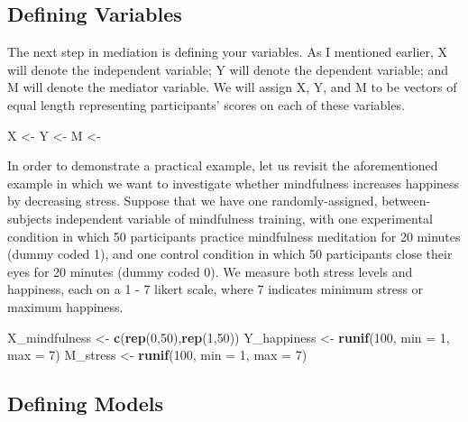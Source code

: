 \documentclass[]{book}
\newenvironment{Shaded}{\begin{snugshade}}{\end{snugshade}}
\newcommand{\DataTypeTok}[1]{\textcolor[rgb]{0.13,0.29,0.53}{#1}}
\newcommand{\DecValTok}[1]{\textcolor[rgb]{0.00,0.00,0.81}{#1}}
\newcommand{\KeywordTok}[1]{\textcolor[rgb]{0.13,0.29,0.53}{\textbf{#1}}}
\newcommand{\NormalTok}[1]{#1}
\newcommand{\StringTok}[1]{\textcolor[rgb]{0.31,0.60,0.02}{#1}}
\begin{document}
\hypertarget{defining-variables}{%
\subsection{Defining Variables}\label{defining-variables}}

The next step in mediation is defining your variables. As I mentioned earlier, X will denote the independent variable; Y will denote the dependent variable; and M will denote the mediator variable. We will assign X, Y, and M to be vectors of equal length representing participants' scores on each of these variables.

\begin{Shaded}
\begin{Highlighting}[]
\NormalTok{X <-}
\NormalTok{Y <-}
\NormalTok{M <-}
\end{Highlighting}
\end{Shaded}

In order to demonstrate a practical example, let us revisit the aforementioned example in which we want to investigate whether mindfulness increases happiness by decreasing stress. Suppose that we have one randomly-assigned, between-subjects independent variable of mindfulness training, with one experimental condition in which 50 participants practice mindfulness meditation for 20 minutes (dummy coded 1), and one control condition in which 50 participants close their eyes for 20 minutes (dummy coded 0). We measure both stress levels and happiness, each on a 1 - 7 likert scale, where 7 indicates minimum stress or maximum happiness.

\begin{Shaded}
\begin{Highlighting}[]
\NormalTok{X_mindfulness <-}\StringTok{ }\KeywordTok{c}\NormalTok{(}\KeywordTok{rep}\NormalTok{(}\DecValTok{0}\NormalTok{,}\DecValTok{50}\NormalTok{),}\KeywordTok{rep}\NormalTok{(}\DecValTok{1}\NormalTok{,}\DecValTok{50}\NormalTok{))}
\NormalTok{Y_happiness <-}\StringTok{ }\KeywordTok{runif}\NormalTok{(}\DecValTok{100}\NormalTok{, }\DataTypeTok{min =} \DecValTok{1}\NormalTok{, }\DataTypeTok{max =} \DecValTok{7}\NormalTok{)}
\NormalTok{M_stress  <-}\StringTok{ }\KeywordTok{runif}\NormalTok{(}\DecValTok{100}\NormalTok{, }\DataTypeTok{min =} \DecValTok{1}\NormalTok{, }\DataTypeTok{max =} \DecValTok{7}\NormalTok{)}
\end{Highlighting}
\end{Shaded}

\hypertarget{defining-models}{%
\subsection{Defining Models}\label{defining-models}}
\end{document}
